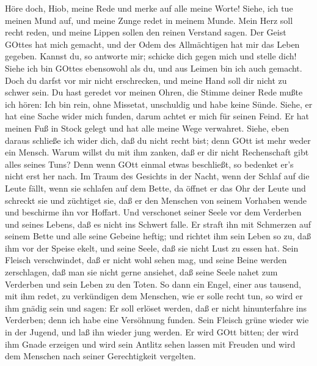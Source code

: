 Höre doch, Hiob, meine Rede und merke auf alle meine Worte!
 Siehe, ich tue meinen Mund auf, und meine Zunge redet in
meinem Munde.  Mein Herz soll recht reden, und meine Lippen
sollen den reinen Verstand sagen.  Der Geist GOttes hat mich
gemacht, und der Odem des Allmächtigen hat mir das Leben gegeben.
 Kannst du, so antworte mir; schicke dich gegen mich und
stelle dich!  Siehe ich bin GOttes ebensowohl als du, und
aus Leimen bin ich auch gemacht.  Doch du darfst vor mir
nicht erschrecken, und meine Hand soll dir nicht zu schwer sein.
 Du hast geredet vor meinen Ohren, die Stimme deiner Rede
mußte ich hören:  Ich bin rein, ohne Missetat, unschuldig
und habe keine Sünde.  Siehe, er hat eine Sache wider mich
funden, darum achtet er mich für seinen Feind.  Er hat
meinen Fuß in Stock gelegt und hat alle meine Wege verwahret.
 Siehe, eben daraus schließe ich wider dich, daß du nicht
recht bist; denn GOtt ist mehr weder ein Mensch.  Warum
willst du mit ihm zanken, daß er dir nicht Rechenschaft gibt alles
seines Tuns?  Denn wenn GOtt einmal etwas beschließt, so
bedenket er's nicht erst her nach.  Im Traum des Gesichts
in der Nacht, wenn der Schlaf auf die Leute fällt, wenn sie schlafen auf
dem Bette,  da öffnet er das Ohr der Leute und schreckt sie
und züchtiget sie,  daß er den Menschen von seinem Vorhaben
wende und beschirme ihn vor Hoffart.  Und verschonet seiner
Seele vor dem Verderben und seines Lebens, daß es nicht ins Schwert
falle.  Er straft ihn mit Schmerzen auf seinem Bette und
alle seine Gebeine heftig;  und richtet ihm sein Leben so
zu, daß ihm vor der Speise ekelt, und seine Seele, daß sie nicht Lust zu
essen hat.  Sein Fleisch verschwindet, daß er nicht wohl
sehen mag, und seine Beine werden zerschlagen, daß man sie nicht gerne
ansiehet,  daß seine Seele nahet zum Verderben und sein
Leben zu den Toten.  So dann ein Engel, einer aus tausend,
mit ihm redet, zu verkündigen dem Menschen, wie er solle recht tun,
 so wird er ihm gnädig sein und sagen: Er soll erlöset
werden, daß er nicht hinunterfahre ins Verderben; denn ich habe eine
Versöhnung funden.  Sein Fleisch grüne wieder wie in der
Jugend, und laß ihn wieder jung werden.  Er wird GOtt
bitten; der wird ihm Gnade erzeigen und wird sein Antlitz sehen lassen
mit Freuden und wird dem Menschen nach seiner Gerechtigkeit vergelten.

